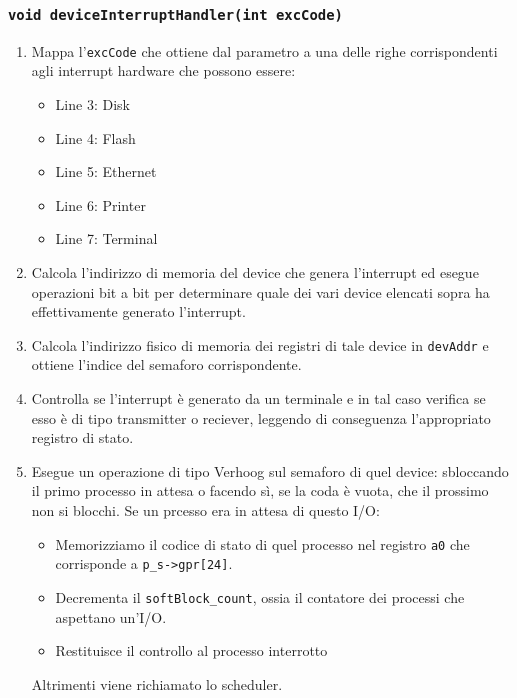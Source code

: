 \documentclass[a4paper,12pt]{article}
\begin{document}
\subsubsection{\texttt{void deviceInterruptHandler(int excCode)}}
\begin{enumerate}
    \item Mappa l'\texttt{excCode} che ottiene dal parametro a una delle righe corrispondenti agli interrupt hardware che possono essere: \begin{itemize}
        \item Line 3: Disk
        \item Line 4: Flash
        \item Line 5: Ethernet
        \item Line 6: Printer
        \item Line 7: Terminal
    \end{itemize} 
    \item Calcola l'indirizzo di memoria del device che genera l'interrupt ed esegue operazioni bit a bit per determinare quale dei vari device elencati sopra ha effettivamente generato l'interrupt.
    \item Calcola l'indirizzo fisico di memoria dei registri di tale device in \texttt{devAddr} e ottiene l'indice del semaforo corrispondente.
    \item Controlla se l'interrupt è generato da un terminale e in tal caso verifica se esso è di tipo transmitter o reciever, leggendo di conseguenza l'appropriato registro di stato.
    \item Esegue un operazione di tipo Verhoog sul semaforo di quel device: sbloccando il primo processo in attesa o facendo sì, se la coda è vuota, che il prossimo non si blocchi. Se un prcesso era in attesa di questo I/O: \begin{itemize}
        \item Memorizziamo il codice di stato di quel processo nel registro \texttt{a0} che corrisponde a \texttt{p\_s->gpr[24]}.
        \item Decrementa il \texttt{softBlock\_count}, ossia il contatore dei processi che aspettano un'I/O.
        \item Restituisce il controllo al processo interrotto
    \end{itemize}
    Altrimenti viene richiamato lo scheduler.
\end{enumerate}
\end{document}
